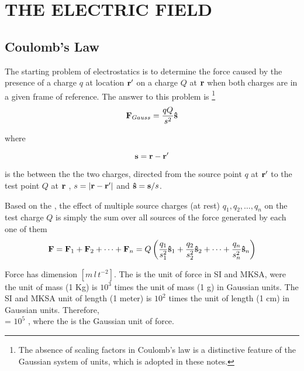 \chapter{THE ELECTRIC FIELD}\label{ch:B1}

\section{Coulomb's Law}\label{sec:1.1} 
The starting problem of electrostatics is to determine the force caused by the presence of a  charge $q$ at location $\vb{r}'$ on a  charge $Q$  at $\vb{r}$ when both charges are  in a given  frame of reference. The answer to this problem is \footnote{The absence of scaling factors in Coulomb's law is a distinctive feature of the Gaussian system of units, which is adopted in these notes.}
\begin{equation}
\vb{F}_{Gauss} = \frac{q Q}{s^2} \vu{s}\label{eq:B.1}
\end{equation}

where 

\begin{equation}\label{eq:B.2}
\vb{s} = \vb{r} - \vb{r}'
\end{equation}

is the   between the the two charges, directed from the source point $q$ at $\vb{r}'$ to the test point $Q$ at $\vb{r}$ , $s = \abs{\vb{r} - \vb{r}'}$ and 
$\vu{s} = \vb{s}/s$.

Based on the , the effect of multiple source charges (at rest) $q_1, q_2, \ldots, q_n$ on the test charge $Q$ is simply the sum over all sources of the force generated by each one of them
\begin{equation}\label{eq:B.3}
\vb{F} =  \vb{F}_1 + \vb{F}_2 + \cdots + \vb{F}_n = Q \left( \frac{q_1}{s_1^2} \vu{s}_1 + \frac{q_2}{s_2^2} \vu{s}_2 + \cdots + \frac{q_n}{s_n^2} \vu{s}_n \right)
\end{equation}

Force has dimension $[m\,l\, t^{-2}]$. The  is the unit of force in SI and MKSA, were the unit of mass (1 Kg) is $10^3$ times the unit of mass (1 g) in Gaussian units. The SI and MKSA unit of length (1 meter) is $10^2$ times the unit of length (1 cm) in Gaussian units. Therefore,\\
 = $10^5$ , where the  is the Gaussian unit of force.  

